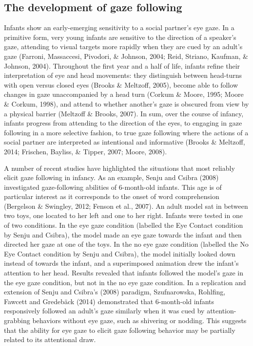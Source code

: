 \documentclass[,man,floatsintext]{apa6}
\begin{document}
\hypertarget{the-development-of-gaze-following}{%
\subsection{The development of gaze following}\label{the-development-of-gaze-following}}

Infants show an early-emerging sensitivity to a social partner's eye gaze. In a primitive form, very young infants are sensitive to the direction of a speaker's gaze, attending to visual targets more rapidly when they are cued by an adult's gaze (Farroni, Massaccesi, Pivodori, \& Johnson, 2004; Reid, Striano, Kaufman, \& Johnson, 2004). Throughout the first year and a half of life, infants refine their interpretation of eye and head movements: they distinguish between head-turns with open versus closed eyes (Brooks \& Meltzoff, 2005), become able to follow changes in gaze unaccompanied by a head turn (Corkum \& Moore, 1995; Moore \& Corkum, 1998), and attend to whether another's gaze is obscured from view by a physical barrier (Meltzoff \& Brooks, 2007). In sum, over the course of infancy, infants progress from attending to the direction of the eyes, to engaging in gaze following in a more selective fashion, to true gaze following where the actions of a social partner are interpreted as intentional and informative (Brooks \& Meltzoff, 2014; Frischen, Bayliss, \& Tipper, 2007; Moore, 2008).

A number of recent studies have highlighted the situations that most reliably elicit gaze following in infancy. As an example, Senju and Csibra (2008) investigated gaze-following abilities of 6-month-old infants. This age is of particular interest as it corresponds to the onset of word comprehension (Bergelson \& Swingley, 2012; Fenson et al., 2007). An adult model sat in between two toys, one located to her left and one to her right. Infants were tested in one of two conditions. In the eye gaze condition (labelled the Eye Contact condition by Senju and Csibra), the model made an eye gaze towards the infant and then directed her gaze at one of the toys. In the no eye gaze condition (labelled the No Eye Contact condition by Senju and Csibra), the model initially looked down instead of towards the infant, and a superimposed animation drew the infant's attention to her head. Results revealed that infants followed the model's gaze in the eye gaze condition, but not in the no eye gaze condition. In a replication and extension of Senju and Csibra's (2008) paradigm, Szufnarowska, Rohlfing, Fawcett and Gredebäck (2014) demonstrated that 6-month-old infants responsively followed an adult's gaze similarly when it was cued by attention-grabbing behaviors without eye gaze, such as shivering or nodding. This suggests that the ability for eye gaze to elicit gaze following behavior may be partially related to its attentional draw.
\end{document}
